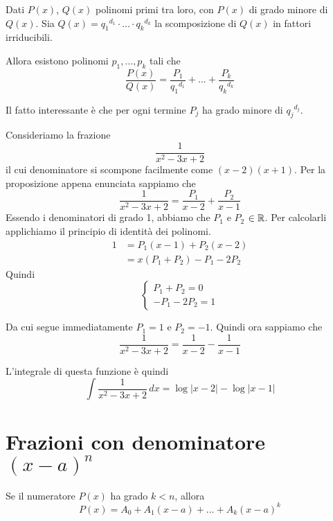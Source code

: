 \begin{proposition}
Dati $P(x)$, $Q(x)$ polinomi primi tra loro, con $P(x)$ di grado minore di $Q(x)$. Sia $Q(x) = {q_1}^{d_1} \cdot \ldots \cdot {q_k}^{d_k}$ la scomposizione di $Q(x)$ in fattori irriducibili.

Allora esistono polinomi $p_1, \ldots, p_k$ tali che 
\begin{equation*}
\frac{P(x)}{Q(x)} = \frac{P_1}{{q_1}^{d_1}} + \ldots + \frac{P_k}{{q_k}^{d_k}}
\end{equation*}

Il fatto interessante è che per ogni termine $P_j$ ha grado minore di ${q_j}^{d_j}$.
\end{proposition}

\begin{example}
Consideriamo la frazione
\begin{equation*}
\frac{1}{x^2-3x+2}
\end{equation*}
il cui denominatore si scompone facilmente come $(x-2)(x+1)$. Per la proposizione appena enunciata sappiamo che
\begin{equation*}
\frac{1}{x^2-3x+2} = \frac{P_1}{x-2} + \frac{P_2}{x-1}
\end{equation*}
Essendo i denominatori di grado 1, abbiamo che $P_1$ e $P_2$ $\in \mathbb R$. Per calcolarli applichiamo il principio di identità dei polinomi.
\begin{align*}
1 &= P_1(x-1) + P_2(x-2) \\
&= x(P_1+P_2) - P_1 -2P_2
\end{align*}
Quindi
\begin{equation*}
\begin{cases}
P_1 + P_2 = 0 \\
-P_1 -2P_2 = 1
\end{cases}
\end{equation*}

Da cui segue immediatamente $P_1 = 1$ e $P_2 = -1$. Quindi ora sappiamo che
\begin{equation*}
\frac{1}{x^2-3x+2} = \frac{1}{x-2} - \frac{1}{x-1}
\end{equation*}

L'integrale di questa funzione è quindi
\begin{equation*}
\int \frac{1}{x^2-3x+2} \, dx = \log |x-2| - \log |x-1|
\end{equation*}
\end{example}

\section{Frazioni con denominatore $(x-a)^n$}
Se il numeratore $P(x)$ ha grado $k < n$, allora
\begin{equation*}
P(x) = A_0 + A_1 (x-a) + \ldots + A_k (x-a)^k
\end{equation*}

